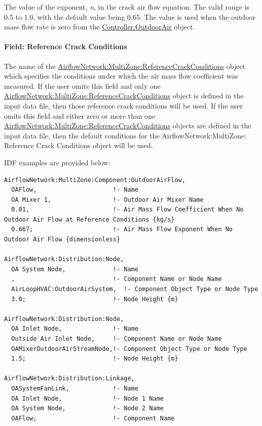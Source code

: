The value of the exponent, \emph{n}, in the crack air flow equation. The valid range is 0.5 to 1.0, with the default value being 0.65. The value is used when the outdoor mass flow rate is zero from the \hyperref[controlleroutdoorair]{Controller:OutdoorAir} object.

\paragraph{Field: Reference Crack Conditions}\label{field-reference-crack-conditions-2016-06-16-1612}

The name of the \hyperref[airflownetworkmultizonereferencecrackconditions]{AirflowNetwork:MultiZone:ReferenceCrackConditions} object which specifies the conditions under which the air mass flow coefficient was measured. If the user omits this field and only one \hyperref[airflownetworkmultizonereferencecrackconditions]{AirflowNetwork:MultiZone:ReferenceCrackConditions} object is defined in the input data file, then those reference crack conditions will be used. If the user omits this field and either zero or more than one \hyperref[airflownetworkmultizonereferencecrackconditions]{AirflowNetwork:MultiZone:ReferenceCrackConditions} objects are defined in the input data file, then the default conditions for the AirflowNetwork:MultiZone: Reference Crack Conditions object will be used.

IDF examples are provided below:

\begin{lstlisting}
AirflowNetwork:MultiZone:Component:OutdoorAirFlow,
  OAFlow,                     !- Name
  OA Mixer 1,                 !- Outdoor Air Mixer Name
  0.01,                       !- Air Mass Flow Coefficient When No Outdoor Air Flow at Reference Conditions {kg/s}
  0.667;                      !- Air Mass Flow Exponent When No Outdoor Air Flow {dimensionless}

AirflowNetwork:Distribution:Node,
  OA System Node,             !- Name
  ,                           !- Component Name or Node Name
  AirLoopHVAC:OutdoorAirSystem,  !- Component Object Type or Node Type
  3.0;                        !- Node Height {m}

AirflowNetwork:Distribution:Node,
  OA Inlet Node,              !- Name
  Outside Air Inlet Node,     !- Component Name or Node Name
  OAMixerOutdoorAirStreamNode,!- Component Object Type or Node Type
  1.5;                        !- Node Height {m}

AirflowNetwork:Distribution:Linkage,
  OASystemFanLink,            !- Name
  OA Inlet Node,              !- Node 1 Name
  OA System Node,             !- Node 2 Name
  OAFlow;                     !- Component Name
\end{lstlisting}

